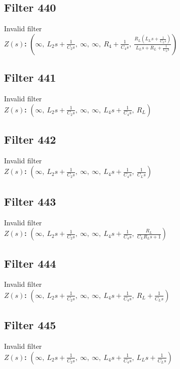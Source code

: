 \documentclass{article}
\begin{document}
\subsection*{Filter 440}
Invalid filter \\ 
\textbf{$Z(s)$:} $\left( \infty, \  L_{2} s + \frac{1}{C_{2} s}, \  \infty, \  \infty, \  R_{4} + \frac{1}{C_{4} s}, \  \frac{R_{L} \left(L_{L} s + \frac{1}{C_{L} s}\right)}{L_{L} s + R_{L} + \frac{1}{C_{L} s}}\right)$ \\ 
\subsection*{Filter 441}
Invalid filter \\ 
\textbf{$Z(s)$:} $\left( \infty, \  L_{2} s + \frac{1}{C_{2} s}, \  \infty, \  \infty, \  L_{4} s + \frac{1}{C_{4} s}, \  R_{L}\right)$ \\ 
\subsection*{Filter 442}
Invalid filter \\ 
\textbf{$Z(s)$:} $\left( \infty, \  L_{2} s + \frac{1}{C_{2} s}, \  \infty, \  \infty, \  L_{4} s + \frac{1}{C_{4} s}, \  \frac{1}{C_{L} s}\right)$ \\ 
\subsection*{Filter 443}
Invalid filter \\ 
\textbf{$Z(s)$:} $\left( \infty, \  L_{2} s + \frac{1}{C_{2} s}, \  \infty, \  \infty, \  L_{4} s + \frac{1}{C_{4} s}, \  \frac{R_{L}}{C_{L} R_{L} s + 1}\right)$ \\ 
\subsection*{Filter 444}
Invalid filter \\ 
\textbf{$Z(s)$:} $\left( \infty, \  L_{2} s + \frac{1}{C_{2} s}, \  \infty, \  \infty, \  L_{4} s + \frac{1}{C_{4} s}, \  R_{L} + \frac{1}{C_{L} s}\right)$ \\ 
\subsection*{Filter 445}
Invalid filter \\ 
\textbf{$Z(s)$:} $\left( \infty, \  L_{2} s + \frac{1}{C_{2} s}, \  \infty, \  \infty, \  L_{4} s + \frac{1}{C_{4} s}, \  L_{L} s + \frac{1}{C_{L} s}\right)$ \\ 
\end{document}
